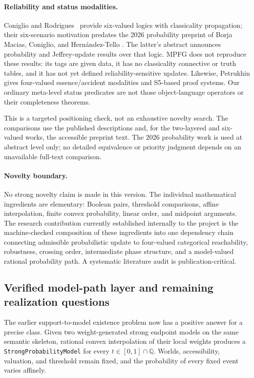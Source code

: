\paragraph{Reliability and status modalities.}
Coniglio and Rodrigues~\cite{ConiglioRodrigues2024} provide six-valued logics
with classicality propagation; their six-scenario motivation predates the
2026 probability preprint of Borja Macias, Coniglio, and Hern{\'a}ndez-Tello
\cite{BorjaMaciasEtAl2026}. The latter's abstract announces probability and
Jeffrey-update results over that logic. MPFG does not reproduce these results:
its tags are given data, it has no classicality connective or truth tables,
and it has not yet defined reliability-sensitive updates. Likewise, Petrukhin
\cite{Petrukhin2026} gives four-valued essence/accident modalities and S5-based
proof systems. Our ordinary meta-level status predicates are not those
object-language operators or their completeness theorems.

This is a targeted positioning check, not an exhaustive novelty search.
The comparisons use the published descriptions and, for the two-layered and
six-valued works, the accessible preprint text. The 2026 probability work is
used at abstract level only; no detailed equivalence or priority judgment
depends on an unavailable full-text comparison.

\paragraph{Novelty boundary.}
No strong novelty claim is made in this version. The individual mathematical ingredients are elementary: Boolean pairs, threshold comparisons, affine interpolation, finite convex probability, linear order, and midpoint arguments. The research contribution currently established internally to the project is the machine-checked composition of these ingredients into one dependency chain connecting admissible probabilistic update to four-valued categorical reachability, robustness, crossing order, intermediate phase structure, and a model-valued rational probability path. A systematic literature audit is publication-critical.

\subsection{Verified model-path layer and remaining realization questions}

The earlier support-to-model existence problem now has a positive answer for a precise class. Given two weight-generated strong endpoint models on the same semantic skeleton, rational convex interpolation of their local weights produces a \texttt{StrongProbabilityModel} for every \(t\in[0,1]\cap\mathbb{Q}\). Worlds, accessibility, valuation, and threshold remain fixed, and the probability of every fixed event varies affinely.


